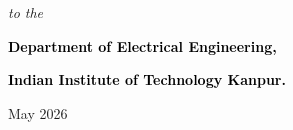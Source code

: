 \begin{titlepage}
\begin{center}
    
    {\large \textit{to the}\par}
    \vspace{0.1cm}
    {\large \textbf{{\textcolor{black}{Department of Electrical Engineering,}}}}

    {\large \textbf{{\textcolor{black}{Indian Institute of Technology Kanpur.}}}}
    \vspace{0.4cm}
    
    {\large {May 2026}}
\end{center}
\end{titlepage}